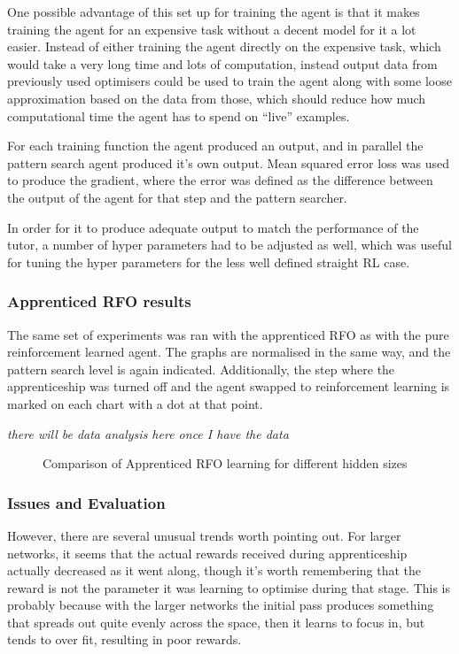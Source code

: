 One possible advantage of this set up for training the agent is that it makes training the agent for an expensive task without a decent model for it a lot easier. Instead of either training the agent directly on the expensive task, which would take a very long time and lots of computation, instead output data from previously used optimisers could be used to train the agent along with some loose approximation based on the data from those, which should reduce how much computational time the agent has to spend on ``live'' examples.

For each training function the agent produced an output, and in parallel the pattern search agent produced it's own output. Mean squared error loss was used to produce the gradient, where the error was defined as the difference between the output of the agent for that step and the pattern searcher.

In order for it to produce adequate output to match the performance of the tutor, a number of hyper parameters had to be adjusted as well, which was useful for tuning the hyper parameters for the less well defined straight RL case.

\subsubsection{Apprenticed RFO results}
The same set of experiments was ran with the apprenticed RFO as with the pure reinforcement learned agent. %
The graphs are normalised in the same way, and the pattern search level is again indicated. Additionally, the step where the apprenticeship was turned off and the agent swapped to reinforcement learning is marked on each chart with a dot at that point.

\emph{there will be data analysis here once I have the data}
\begin{figure}
\centering

\caption{Comparison of Apprenticed RFO learning for different hidden sizes}
\label{fig:exp1apprfo}
\end{figure}

%
%

\subsubsection{Issues and Evaluation}
 However, there are several unusual trends worth pointing out. For larger networks, it seems that the actual rewards received during apprenticeship actually decreased as it went along, though it's worth remembering that the reward is not the parameter it was learning to optimise during that stage. This is probably because with the larger networks the initial pass produces something that spreads out quite evenly across the space, then it learns to focus in, but tends to over fit, resulting in poor rewards.

